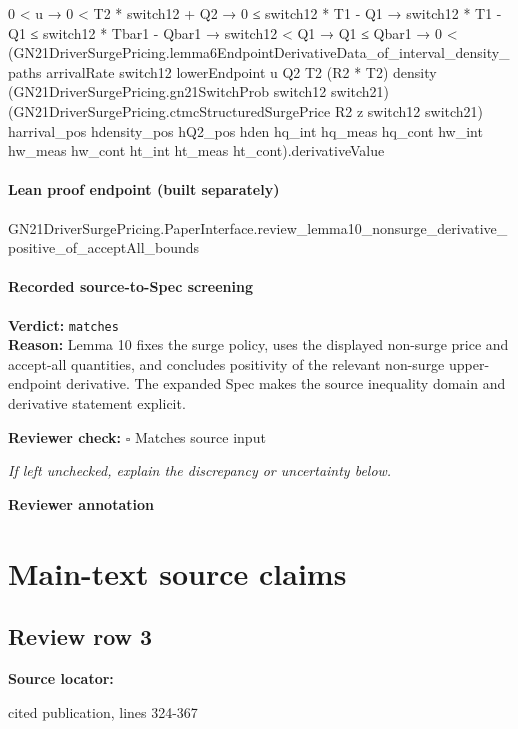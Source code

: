 \documentclass[10pt]{article}
\newcommand{\reviewerbox}{%
  \par\noindent\fbox{\parbox{0.96\linewidth}{\rule{0pt}{0.38in}}}\par
}
\newcommand{\reviewmatch}[1]{%
  \par\noindent\textbf{Reviewer check:} $\square$\; #1\par
  \noindent\emph{If left unchecked, explain the discrepancy or uncertainty below.}\par
}
\begin{document}
\begin{ReviewVerbatim}
                    0 < u →
                      0 < T2 * switch12 + Q2 →
                        0 ≤ switch12 * T1 - Q1 →
                          switch12 * T1 - Q1 ≤ switch12 * Tbar1 - Qbar1 →
                            switch12 < Q1 →
                              Q1 ≤ Qbar1 →
                                0 <
                                  (GN21DriverSurgePricing.lemma6EndpointDerivativeData_of_interval_density_paths
                                      arrivalRate switch12 lowerEndpoint u Q2 T2 (R2 * T2) density
                                      (GN21DriverSurgePricing.gn21SwitchProb switch12 switch21)
                                      (GN21DriverSurgePricing.ctmcStructuredSurgePrice R2 z switch12 switch21)
                                      harrival_pos hdensity_pos hQ2_pos hden hq_int hq_meas hq_cont hw_int hw_meas
                                      hw_cont ht_int ht_meas ht_cont).derivativeValue
\end{ReviewVerbatim}

\paragraph{Lean proof endpoint (built separately)}\begin{ReviewVerbatim}
GN21DriverSurgePricing.PaperInterface.review_lemma10_nonsurge_derivative_positive_of_acceptAll_bounds
\end{ReviewVerbatim}

\paragraph{Recorded source-to-Spec screening}
\textbf{Verdict:} \texttt{matches}
\\
\textbf{Reason:} Lemma 10 fixes the surge policy, uses the displayed non-surge price and accept-all quantities, and concludes positivity of the relevant non-surge upper-endpoint derivative. The expanded Spec makes the source inequality domain and derivative statement explicit.
\reviewmatch{Matches source input}
\noindent\textbf{Reviewer annotation}\par
\reviewerbox
\clearpage
\hypertarget{source-claim-0847fd2171fe1fa6}{}
\hypertarget{source-section-0c7af8265958a9ea}{}
\section*{Main-text source claims}
\subsection*{Review row 3}
\textbf{Source locator:} {\footnotesize\raggedright cited publication, lines 324-\allowbreak{}367\par}
\end{document}
